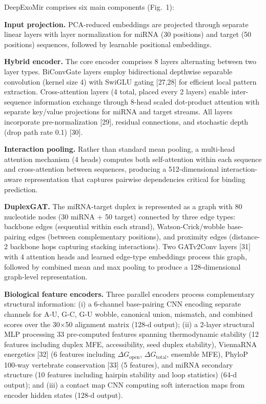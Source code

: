 \documentclass[sn-mathphys-num]{sn-jnl}
\begin{document}
DeepExoMir comprises six main components (Fig.~1):

\textbf{Input projection.} PCA-reduced embeddings are projected through separate linear layers with layer normalization for miRNA (30 positions) and target (50 positions) sequences, followed by learnable positional embeddings.

\textbf{Hybrid encoder.} The core encoder comprises 8 layers alternating between two layer types. BiConvGate layers employ bidirectional depthwise separable convolution (kernel size 4) with SwiGLU gating [27,28] for efficient local pattern extraction. Cross-attention layers (4 total, placed every 2 layers) enable inter-sequence information exchange through 8-head scaled dot-product attention with separate key/value projections for miRNA and target streams. All layers incorporate pre-normalization [29], residual connections, and stochastic depth (drop path rate 0.1) [30].

\textbf{Interaction pooling.} Rather than standard mean pooling, a multi-head attention mechanism (4 heads) computes both self-attention within each sequence and cross-attention between sequences, producing a 512-dimensional interaction-aware representation that captures pairwise dependencies critical for binding prediction.

\textbf{DuplexGAT.} The miRNA-target duplex is represented as a graph with 80 nucleotide nodes (30 miRNA + 50 target) connected by three edge types: backbone edges (sequential within each strand), Watson-Crick/wobble base-pairing edges (between complementary positions), and proximity edges (distance-2 backbone hops capturing stacking interactions). Two GATv2Conv layers [31] with 4 attention heads and learned edge-type embeddings process this graph, followed by combined mean and max pooling to produce a 128-dimensional graph-level representation.

\textbf{Biological feature encoders.} Three parallel encoders process complementary structural information: (i) a 6-channel base-pairing CNN encoding separate channels for A-U, G-C, G-U wobble, canonical union, mismatch, and combined scores over the 30$\times$50 alignment matrix (128-d output); (ii) a 2-layer structural MLP processing 33 pre-computed features spanning thermodynamic stability (12 features including duplex MFE, accessibility, seed duplex stability), ViennaRNA energetics [32] (6 features including $\Delta G_\text{open}$, $\Delta G_\text{total}$, ensemble MFE), PhyloP 100-way vertebrate conservation [33] (5 features), and miRNA secondary structure (10 features including hairpin stability and loop statistics) (64-d output); and (iii) a contact map CNN computing soft interaction maps from encoder hidden states (128-d output).
\end{document}
